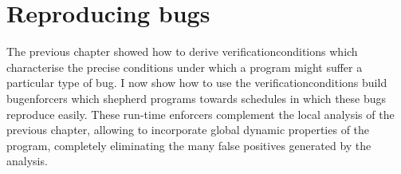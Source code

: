 \chapter{Reproducing bugs}
\label{sect:reproducing_bugs}

The previous chapter showed how to derive
\glspl{verificationcondition} which characterise the precise
conditions under which a program might suffer a particular type of
bug.  I now show how to use the \glspl{verificationcondition} build
\glspl{bugenforcer} which shepherd programs towards schedules in which
these bugs reproduce easily.  These run-time enforcers complement the
local analysis of the previous chapter, allowing {\technique} to
incorporate global dynamic properties of the program, completely
eliminating the many false positives generated by the {\StateMachine}
analysis.

